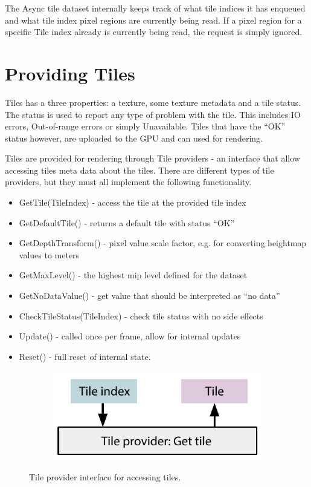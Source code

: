 The Async tile dataset internally keeps track of what tile indices it has enqueued and what tile index pixel regions are currently being read. If a pixel region for a specific Tile index already is currently being read, the request is simply ignored.


\section{Providing Tiles}
Tiles has a three properties: a texture, some texture metadata and a tile status. The status is used to report any type of problem with the tile. This includes IO errors, Out-of-range errors or simply Unavailable. Tiles that have the ``OK'' status however, are uploaded to the GPU and can used for rendering. 

Tiles are provided for rendering through Tile providers - an interface that allow accessing tiles meta data about the tiles. There are different types of tile providers, but they must all implement the following functionality.


\begin{itemize}
\item GetTile(TileIndex) - access the tile at the provided tile index
\item GetDefaultTile() - returns a default tile with status ``OK''
\item GetDepthTransform() - pixel value scale factor, e.g. for converting heightmap values to meters
\item GetMaxLevel() - the highest mip level defined for the dataset
\item GetNoDataValue() - get value that should be interpreted as ``no data''
\item CheckTileStatus(TileIndex) - check tile status with no side effects
\item Update() - called once per frame, allow for internal updates
\item Reset() - full reset of internal state. 
\end{itemize}

\begin{figure}[htbp]
    \centering
    \begin{subfigure}[bt]{0.4\textwidth}
        \includegraphics[width=\textwidth]{figures/implementation/tileprovider/tileprovider_gettile.pdf}
    \end{subfigure}
    \caption{Tile provider interface for accessing tiles.}
    \label{fig:tileprovider}
\end{figure}

